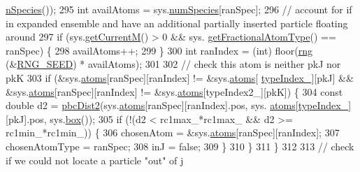 \begin{DoxyCode}
      \hyperlink{classsim_system_ab5e2e9b6204de15520302fe1d51688dd}{nSpecies}());
295                         \textcolor{keywordtype}{int} availAtoms = sys.\hyperlink{classsim_system_a9eea865e6dc1cff377b1e79c4d9c23f0}{numSpecies}[ranSpec];
296                         \textcolor{comment}{// account for if in expanded ensemble and have an additional partially inserted
       particle floating around}
297                         \textcolor{keywordflow}{if} (sys.\hyperlink{classsim_system_a299fe4372e610b554eaaf5f5957b2dbc}{getCurrentM}() > 0 && sys.
      \hyperlink{classsim_system_a0500a9e84eecfbde7a98cf8a34f719d5}{getFractionalAtomType}() == ranSpec) \{
298                             availAtoms++;
299                         \}
300                         \textcolor{keywordtype}{int} ranIndex = (int) floor(\hyperlink{utilities_8cpp_a0f9542af4b475ac79cb679d7a8d14db0}{rng} (&\hyperlink{global_8h_a3f4e4ea24d5a5c66feae55d1f329c884}{RNG\_SEED}) * availAtoms);
301 
302                         \textcolor{comment}{// check this atom is neither pkJ nor pkK}
303                         \textcolor{keywordflow}{if} (&sys.\hyperlink{classsim_system_a90421b19082f7fb8fc23b7264b1161e4}{atoms}[ranSpec][ranIndex] != &sys.\hyperlink{classsim_system_a90421b19082f7fb8fc23b7264b1161e4}{atoms}[
      \hyperlink{classmc_move_acb731965547b0326ef318ec96da8b46a}{typeIndex\_}][pkJ] && &sys.\hyperlink{classsim_system_a90421b19082f7fb8fc23b7264b1161e4}{atoms}[ranSpec][ranIndex] != &sys.\hyperlink{classsim_system_a90421b19082f7fb8fc23b7264b1161e4}{atoms}[typeIndex2\_][pkK]) \{
304                             \textcolor{keyword}{const} \textcolor{keywordtype}{double} d2 = \hyperlink{utilities_8cpp_abb1db3a8a3ac46e044bbe7b2c5684c0a}{pbcDist2}(sys.\hyperlink{classsim_system_a90421b19082f7fb8fc23b7264b1161e4}{atoms}[ranSpec][ranIndex].pos, sys.
      \hyperlink{classsim_system_a90421b19082f7fb8fc23b7264b1161e4}{atoms}[\hyperlink{classmc_move_acb731965547b0326ef318ec96da8b46a}{typeIndex\_}][pkJ].pos, sys.\hyperlink{classsim_system_a8bff9dfb95b1b09a0fab2c1c485ade07}{box}());
305                     \textcolor{keywordflow}{if} (!(d2 < rc1max\_*rc1max\_ && d2 >= rc1min\_*rc1min\_)) \{
306                                     chosenAtom = &sys.\hyperlink{classsim_system_a90421b19082f7fb8fc23b7264b1161e4}{atoms}[ranSpec][ranIndex];
307                                     chosenAtomType = ranSpec;
308                                     inJ = \textcolor{keyword}{false};
309                                 \}
310                         \}
311                     \}
312 
313                     \textcolor{comment}{// check if we could not locate a particle "out" of j}

\end{DoxyCode}
